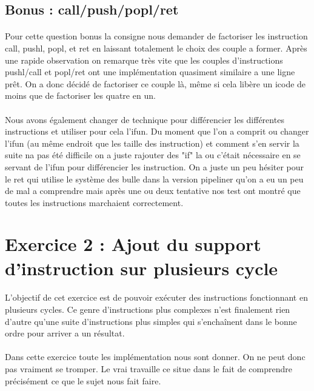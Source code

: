 \documentclass[12pt]{article}
\begin{document}
\subsection{Bonus : call/push/popl/ret}

\paragraph{} Pour cette question bonus la consigne nous demander de factoriser les instruction call, pushl, popl, et ret en laissant totalement le choix des couple a former.
Après une rapide observation on remarque très vite que les couples d'instructions pushl/call et popl/ret ont une implémentation quasiment similaire a une ligne prêt. On a donc décidé de factoriser ce couple là, même si cela libère un icode de moins que de factoriser les quatre en un.

\paragraph{} Nous avons également changer de technique pour différencier les différentes instructions et utiliser pour cela l'ifun.
Du moment que l'on a comprit ou changer l'ifun (au même endroit que les taille des instruction) et comment s'en servir la suite na pas été difficile on a juste rajouter des "if" la ou c’était nécessaire en se servant de l'ifun pour différencier les instruction. On a juste un peu hésiter pour le ret qui utilise le système des bulle dans la version pipeliner qu'on a eu un peu de mal a comprendre mais après une ou deux tentative nos test ont montré que toutes les instructions marchaient correctement.



\newpage

\section{Exercice 2 : Ajout du support d'instruction sur plusieurs cycle}

\paragraph{}L'objectif de cet exercice est de pouvoir exécuter des instructions fonctionnant en plusieurs cycles. Ce genre d'instructions plus complexes n'est finalement rien d'autre qu'une suite d'instructions plus simples qui s’enchaînent dans le bonne ordre pour arriver a un résultat.

\paragraph{} Dans cette exercice toute les implémentation nous sont donner. On ne peut donc pas vraiment se tromper. Le vrai travaille ce situe dans le fait de comprendre précisément ce que le sujet nous fait faire.
\end{document}
